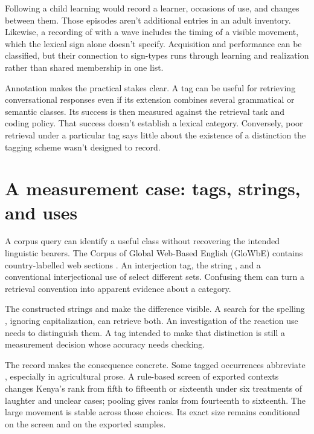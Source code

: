 \documentclass[12pt]{article}
\begin{document}
Following a child learning  would record a learner,
occasions of use, and changes between them. Those episodes aren't
additional entries in an adult inventory. Likewise, a recording of
 with a wave includes the timing of a visible movement,
which the lexical sign alone doesn't specify. Acquisition and performance
can be classified, but their connection to sign-types runs through
learning and realization rather than shared membership in one list.

Annotation makes the practical stakes clear. A tag can be useful
for retrieving conversational responses even if its extension combines
several grammatical or semantic classes. Its success is then measured
against the retrieval task and coding policy. That success doesn't
establish a lexical category. Conversely, poor retrieval under a
particular tag says little about the existence of a distinction
the tagging scheme wasn't designed to record.

\section{A measurement case: tags, strings, and uses}\label{sec:evidence}

A corpus query can identify a useful class without recovering the intended
linguistic bearers. The Corpus of Global Web-Based English (GloWbE)
contains country-labelled web sections \citep{daviesfuchs2015}.
An interjection tag, the string , and a conventional
interjectional use of  select different sets. Confusing them
can turn a retrieval convention into apparent evidence about a category.

The constructed strings  and  make the difference visible. A search for the spelling
, ignoring capitalization, can retrieve both. An investigation
of the reaction use needs to distinguish them. A tag intended to
make that distinction is still a measurement decision whose accuracy
needs checking.

The  record makes the consequence concrete. Some tagged
occurrences abbreviate , especially in agricultural prose.
A rule-based screen of exported contexts changes Kenya's rank from fifth
to fifteenth or sixteenth under six treatments of laughter and unclear
cases; pooling gives ranks from fourteenth to sixteenth. The large
movement is stable across those choices. Its exact size remains
conditional on the screen and on the exported samples.
\end{document}
